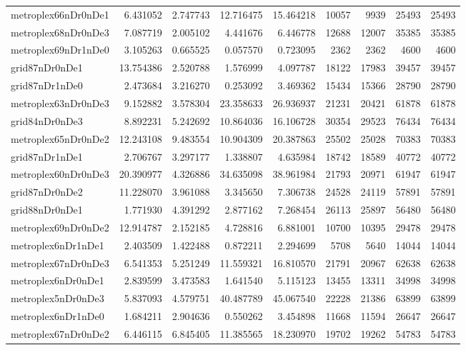\begin{longtable}{|l|r|r|r|r|r|r|r|r|}
metroplex66nDr0nDe1 & 6.431052 & 2.747743 & 12.716475 & 15.464218 & 10057 & 9939 & 25493 & 25493 \\
metroplex68nDr0nDe3 & 7.087719 & 2.005102 & 4.441676 & 6.446778 & 12688 & 12007 & 35385 & 35385 \\
metroplex69nDr1nDe0 & 3.105263 & 0.665525 & 0.057570 & 0.723095 & 2362 & 2362 & 4600 & 4600 \\
grid87nDr0nDe1 & 13.754386 & 2.520788 & 1.576999 & 4.097787 & 18122 & 17983 & 39457 & 39457 \\
grid87nDr1nDe0 & 2.473684 & 3.216270 & 0.253092 & 3.469362 & 15434 & 15366 & 28790 & 28790 \\
metroplex63nDr0nDe3 & 9.152882 & 3.578304 & 23.358633 & 26.936937 & 21231 & 20421 & 61878 & 61878 \\
grid84nDr0nDe3 & 8.892231 & 5.242692 & 10.864036 & 16.106728 & 30354 & 29523 & 76434 & 76434 \\
metroplex65nDr0nDe2 & 12.243108 & 9.483554 & 10.904309 & 20.387863 & 25502 & 25028 & 70383 & 70383 \\
grid87nDr1nDe1 & 2.706767 & 3.297177 & 1.338807 & 4.635984 & 18742 & 18589 & 40772 & 40772 \\
metroplex60nDr0nDe3 & 20.390977 & 4.326886 & 34.635098 & 38.961984 & 21793 & 20971 & 61947 & 61947 \\
grid87nDr0nDe2 & 11.228070 & 3.961088 & 3.345650 & 7.306738 & 24528 & 24119 & 57891 & 57891 \\
grid88nDr0nDe1 & 1.771930 & 4.391292 & 2.877162 & 7.268454 & 26113 & 25897 & 56480 & 56480 \\
metroplex69nDr0nDe2 & 12.914787 & 2.152185 & 4.728816 & 6.881001 & 10700 & 10395 & 29478 & 29478 \\
metroplex6nDr1nDe1 & 2.403509 & 1.422488 & 0.872211 & 2.294699 & 5708 & 5640 & 14044 & 14044 \\
metroplex67nDr0nDe3 & 6.541353 & 5.251249 & 11.559321 & 16.810570 & 21791 & 20967 & 62638 & 62638 \\
metroplex6nDr0nDe1 & 2.839599 & 3.473583 & 1.641540 & 5.115123 & 13455 & 13311 & 34998 & 34998 \\
metroplex5nDr0nDe3 & 5.837093 & 4.579751 & 40.487789 & 45.067540 & 22228 & 21386 & 63899 & 63899 \\
metroplex6nDr1nDe0 & 1.684211 & 2.904636 & 0.550262 & 3.454898 & 11668 & 11594 & 26647 & 26647 \\
metroplex67nDr0nDe2 & 6.446115 & 6.845405 & 11.385565 & 18.230970 & 19702 & 19262 & 54783 & 54783 \\

\end{longtable}
